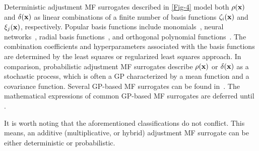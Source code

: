 \documentclass[journal ]{new-aiaa}
\begin{document}
	Deterministic adjustment MF surrogates described in \cref{Fig-4} model both $\rho({\bf {x}})$ and $\delta({\bf{x}})$ as linear combinations of a finite number of basis functions $\zeta_i({\bf {x}})$ and $\xi_j({\bf x})$, respectively.
	Popular basis functions include monomials~\citep{ZhangYiming2018,FernandezGodino2019}, neural networks~\citep{Kou2019}, radial basis functions~\citep{Tyan2015,LiuB2016,Durantin2017}, and orthogonal polynomial functions~\citep{Palar2016}. 
	The combination coefficients and hyperparameters associated with the basis functions are determined by the least squares or regularized least squares approach. 
	In comparison, probabilistic adjustment MF surrogates describe $\rho({\bf {x}})$ or $\delta({\bf{x}})$ as a stochastic process, which is often a GP characterized by a mean function and a covariance function.   
	Several GP-based MF surrogates can be found in~\citet{Brevault2020}.
	The mathematical expressions of common GP-based MF surrogates are deferred until .  
	
	It is worth noting that the aforementioned classifications do not conflict.
	This means, an additive (multiplicative, or hybrid) adjustment MF surrogate can be either deterministic or probabilistic.
	
\end{document}
